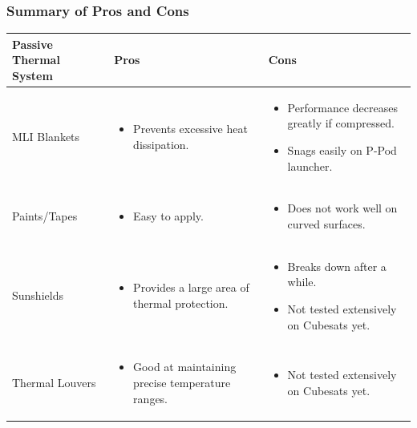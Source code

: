 \subsubsection{Summary of Pros and Cons}

\begin{table}[H]
\centering
\begin{tabular}{|p{}|p{}|p{}|} 
\hline
\textbf{Passive Thermal System} & \textbf{Pros} & \textbf{Cons}
\\
\hline
     MLI Blankets
     &
    \begin{itemize}
        \item Prevents excessive heat dissipation.
    \end{itemize}
    &
    \begin{itemize}
        \item Performance decreases greatly if compressed.
        \item Snags easily on P-Pod launcher.
    \end{itemize}
    \\
\hline
     Paints/Tapes
     &
    \begin{itemize}
        \item Easy to apply.
    \end{itemize}
    &
        \begin{itemize}
        \item Does not work well on curved surfaces.
    \end{itemize}
    \\
\hline
    Sunshields
    &
    \begin{itemize}
        \item Provides a large area of thermal protection.
    \end{itemize}
    &
    \begin{itemize}
        \item Breaks down after a while.
        \item Not tested extensively on Cubesats yet.
    \end{itemize}
    \\
\hline
    Thermal Louvers
    &
    \begin{itemize}
        \item Good at maintaining precise temperature ranges.
    \end{itemize}
    &
    \begin{itemize}
        \item Not tested extensively on Cubesats yet.

\end{itemize}
\end{tabular}
\end{table}
